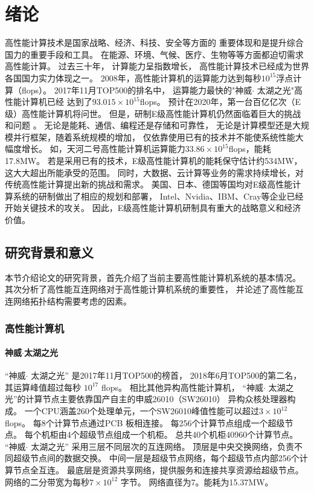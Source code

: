 \chapter{绪论}

高性能计算技术是国家战略、经济、科技、安全等方面的
重要体现和是提升综合国力的重要手段和工具。
在能源、环境、气候、医疗、生物等等方面都迫切需求高性能计算。
过去三十年， 计算能力呈指数增长，
高性能计算技术已经成为世界各国国力实力体现之一。
2008年，高性能计算机的运算能力达到每秒$10^{15}$浮点计算（flops）。
2017年11月TOP500的排名中，
运算能力最快的"神威$\cdot$ 太湖之光"高性能计算机已经
达到了$93.015\times10^{15}$flops。
预计在2020年，第一台百亿亿次（E级）高性能计算机将问世。
但是，研制E级高性能计算机仍然面临着巨大的挑战和问题
。
无论是能耗、通信、编程还是存储和可靠性，
无论是计算模型还是大规模并行框架，随着系统规模的增加，
仅依靠使用已有的技术并不能使系统性能大幅度增长。
如，天河二号高性能计算机运算能力$33.86\times10^{15}$flops，能耗17.8MW。
若是采用已有的技术，E级高性能计算机的能耗保守估计约534MW，
这大大超出所能承受的范围。
同时，大数据、云计算等业务的需求持续增长，对传统高性能计算提出新的挑战和需求。
美国、日本、德国等国均对E级高性能计算系统的研制做出了相应的规划和部署，
Intel、Nvidia、IBM、Cray等企业已经开始关键技术的攻关。
因此，E级高性能计算机研制具有重大的战略意义和经济价值。

\section{研究背景和意义}
本节介绍论文的研究背景，首先介绍了当前主要高性能计算机系统的基本情况。
其次分析了高性能互连网络对于高性能计算机系统的重要性，
并论述了高性能互连网络拓扑结构需要考虑的因素。

\subsection{高性能计算机}

\subsubsection{神威$\cdot$太湖之光}
“神威$\cdot$ 太湖之光” 是2017年11月TOP500的榜首，
2018年6月TOP500的第二名，
其运算峰值超过每秒 $10^{17}$ flops。
相比其他异构高性能计算机，
“神威$\cdot$ 太湖之光”的计算节点主要依靠国产自主的申威26010（SW26010）
异构众核处理器构成。
一个CPU涵盖260个处理单元，一个SW26010峰值性能可以超过$3\times10^{12}$ flops。
每8个计算节点通过PCB 板相连接。
每256个计算节点组成一个超级节点。
每个机柜由4个超级节点组成一个机柜。
总共40个机柜40960个计算节点。
“神威$\cdot$ 太湖之光” 采用三层不同层次的互连网络。
顶层是中央交换网络，负责不同超级节点间的数据交换。
中间一层是超级节点网络，每个超级节点内部256个计算节点全互连。
最底层是资源共享网络，提供服务和连接共享资源给超级节点。
网络的二分带宽为每秒$7\times10^{12}$ 字节。
网络直径为7。能耗为15.37MW。

